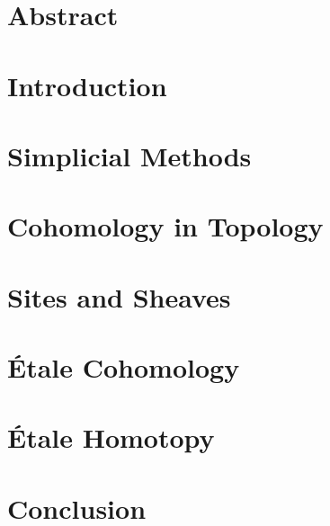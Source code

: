 \documentclass[11pt, openany]{memoir}
\theoremstyle{definition}
\begin{document}
  \nocite{*}

  \chapter*{Abstract}
  

  \begin{KeepFromToc} 
  \tableofcontents
  \end{KeepFromToc} 

  \chapter{Introduction}
  

  \chapter{Simplicial Methods}
  

  \chapter{Cohomology in Topology}
  \label{chap:cohomology}
  

  \chapter{Sites and Sheaves}
  

  \chapter{\'Etale Cohomology}
  
  

  \chapter{\'Etale Homotopy}

  \chapter{Conclusion}
  

  
  
\end{document}
